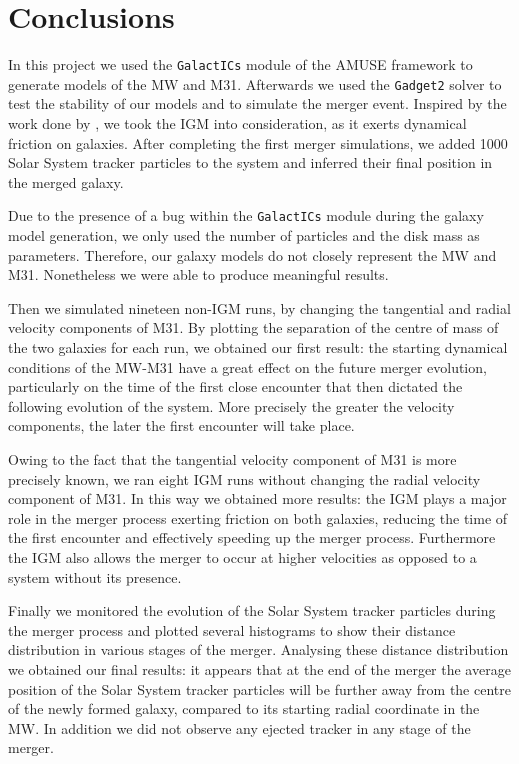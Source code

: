 \documentclass[a4paper,12pt, english]{article}
\begin{document}
\section{Conclusions}
\label{conclusions}
In this project we used the \texttt{GalactICs} module of the AMUSE framework to generate models of the MW and M31. Afterwards we used the \texttt{Gadget2} solver to test the stability of our models and to simulate the merger event. Inspired by the work done by \textcite{Cox_2008}, we took the IGM into consideration, as it exerts dynamical friction on galaxies. After completing the first merger simulations, we added 1000 Solar System tracker particles to the system and inferred their final position in the merged galaxy.\par
\smallskip
Due to the presence of a bug within the \texttt{GalactICs} module during the galaxy model generation, we only used the number of particles and the disk mass as parameters. Therefore, our galaxy models do not closely represent the MW and M31. Nonetheless we were able to produce meaningful results.\par
\smallskip
Then we simulated nineteen non-IGM runs, by changing the tangential and radial velocity components of M31. By plotting the separation of the centre of mass of the two galaxies for each run, we obtained our first result: the starting dynamical conditions of the MW-M31 have a great effect on the future merger evolution, particularly on the time of the first close encounter that then dictated the following evolution of the system. More precisely the greater the velocity components, the later the first encounter will take place.\par
\smallskip
Owing to the fact that the tangential velocity component of M31 is more precisely known, we ran eight IGM runs without changing the radial velocity component of M31. In this way we obtained more results: the IGM plays a major role in the merger process exerting friction on both galaxies, reducing the time of the first encounter and effectively speeding up the merger process. Furthermore the IGM also allows the merger to occur at higher velocities as opposed to a system without its presence.\par
\smallskip
Finally we monitored the evolution of the Solar System tracker particles during the merger process and plotted several histograms to show their distance distribution in various stages of the merger. Analysing these distance distribution we obtained our final results: it appears that at the end of the merger the average position of the Solar System tracker particles will be further away from the centre of the newly formed galaxy, compared to its starting radial coordinate in the MW. In addition we did not observe any ejected tracker in any stage of the merger.\par
\end{document}
